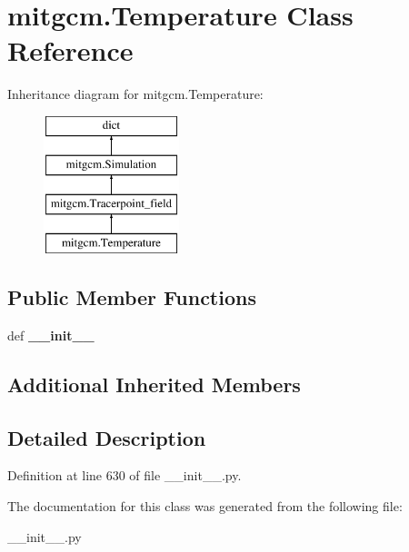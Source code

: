 \hypertarget{classmitgcm_1_1Temperature}{\section{mitgcm.\+Temperature Class Reference}
\label{classmitgcm_1_1Temperature}
}
Inheritance diagram for mitgcm.\+Temperature\+:\begin{figure}[H]
\begin{center}
\leavevmode
\includegraphics[height=4.000000cm]{classmitgcm_1_1Temperature}
\end{center}
\end{figure}
\subsection*{Public Member Functions}
\begin{DoxyCompactItemize}
\item 
\hypertarget{classmitgcm_1_1Temperature_af8a4e75bd94a1c6ab81f96ef0c4179f7}{def {\bfseries \+\_\+\+\_\+init\+\_\+\+\_\+}}\label{classmitgcm_1_1Temperature_af8a4e75bd94a1c6ab81f96ef0c4179f7}

\end{DoxyCompactItemize}
\subsection*{Additional Inherited Members}


\subsection{Detailed Description}


Definition at line 630 of file \+\_\+\+\_\+init\+\_\+\+\_\+.\+py.



The documentation for this class was generated from the following file\+:\begin{DoxyCompactItemize}
\item 
\+\_\+\+\_\+init\+\_\+\+\_\+.\+py\end{DoxyCompactItemize}
